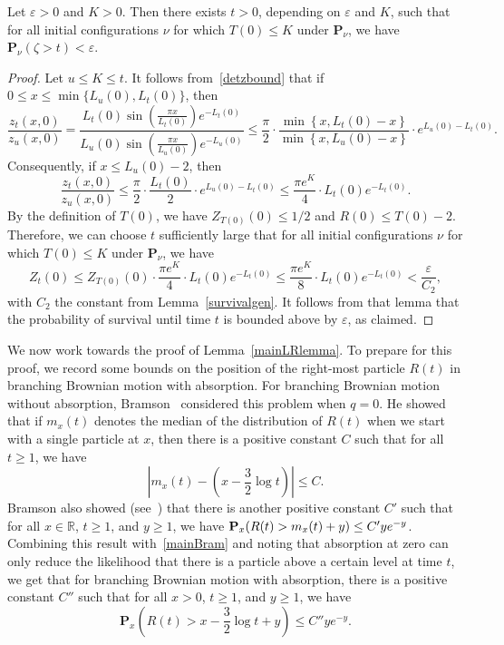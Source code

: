 \documentclass[AHL,Unicode,longabstracts,published]{cedram}
\newcommand*\eps{\varepsilon}
\renewcommand*\P{\mathbf{P}}
\newcommand*\R{\mathbb{R}}
\newcommand{\1} {\mathds{1}}
\begin{document}
\begin{lemm}\label{smallTlem}
Let $\eps > 0$ and $K > 0$. Then there exists $t > 0$, depending on $\eps$ and $K$, such that for all initial configurations $\nu$ for which $T(0) \leq K$ under $\P_\nu$, we have $\P_{\nu}(\zeta > t) < \eps$.
\end{lemm}

\begin{proof}
Let $u \leq K \leq t$. It follows from~\eqref{detzbound} that if $0 \leq x \leq \min\{L_u(0), L_t(0)\}$, then
\[
\frac{z_t(x,0)}{z_u(x,0)} = \frac{L_t(0) \sin\left(\frac{\pi x}{L_t(0)}\right) e^{-L_t(0)}}{L_u(0) \sin\left(\frac{\pi x}{L_u(0)}\right) e^{-L_u(0)}} \leq \frac{\pi}{2} \cdot \frac{\min\left\{x, L_t(0) - x\right\}}{\min\left\{x, L_u(0) - x\right\}} \cdot e^{L_u(0) - L_t(0)}.
\]
Consequently, if $x \leq L_u(0) - 2$, then
\begin{equation}\label{KZratio}
\frac{z_t(x,0)}{z_u(x,0)} \leq \frac{\pi}{2} \cdot \frac{L_t(0)}{2} \cdot e^{L_u(0) - L_t(0)} \leq \frac{\pi e^K}{4} \cdot L_t(0) e^{-L_t(0)}.
\end{equation}
By the definition of $T(0)$, we have $Z_{T(0)}(0) \leq 1/2$ and $R(0) \leq T(0) - 2$. Therefore, we can choose $t$ sufficiently large that for all initial configurations $\nu$ for which $T(0) \leq K$ under $\P_\nu$, we have
\[
Z_t(0) \leq Z_{T(0)}(0) \cdot \frac{\pi e^K}{4} \cdot L_t(0) e^{-L_t(0)} \leq \frac{\pi e^K}{8} \cdot L_t(0) e^{-L_t(0)} < \frac{\eps}{C_2},
\]
with $C_2$ the constant from Lemma~\ref{survivalgen}. It follows from that lemma that the probability of survival until time $t$ is bounded above by $\eps$, as claimed.
\end{proof}

We now work towards the proof of Lemma~\ref{mainLRlemma}. To prepare for this proof, we record some bounds on the position of the right-most particle $R(t)$ in branching Brownian motion with absorption. For branching Brownian motion without absorption, Bramson~\cite{bram83} considered this problem when $q = 0$. He showed that if $m_x(t)$ denotes the median of the distribution of $R(t)$ when we start with a single particle at $x$, then there is a positive constant $C$ such that for all $t \geq 1$, we have
\begin{equation}\label{mainBram}
\left|m_x(t) - \left(x - \frac{3}{2} \log t \right) \right| \leq C.
\end{equation}
Bramson also showed (see~\cite[equation~(8.17)]{bram83}) that there is another positive constant $C'$ such that for all $x \in \R$, $t \geq 1$, and $y \geq 1$, we have $\P_x(R(t) > m_x(t) + y)\linebreak \leq C' y e^{-y}$. Combining this result with~\eqref{mainBram} and noting that absorption at zero can only reduce the likelihood that there is a particle above a certain level at time $t$, we get that for branching Brownian motion with absorption, there is a positive constant $C''$ such that for all $x > 0$, $t \geq 1$, and $y \geq 1$, we have
\begin{equation}\label{Bramabs}
\P_x\left(R(t) > x - \frac{3}{2} \log t + y \right) \leq C'' y e^{-y}.
\end{equation}
\end{document}
